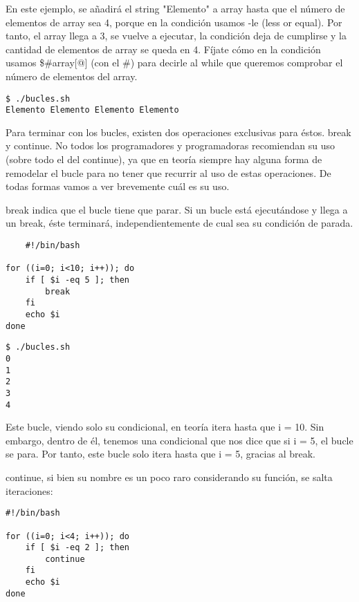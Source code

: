 En este ejemplo, se añadirá el string "Elemento" a array hasta que el número de elementos de array sea 4, porque en la condición usamos -le (less or equal). Por tanto, el array llega a 3, se vuelve a ejecutar, la condición deja de cumplirse y la cantidad de elementos de array se queda en 4. Fíjate cómo en la condición usamos \${\#array[@]} (con el \#) para decirle al while que queremos comprobar el número de elementos del array.

\begin{tcolorbox-code}
\begin{lstlisting}
$ ./bucles.sh
Elemento Elemento Elemento Elemento
\end{lstlisting}
\end{tcolorbox-code}

Para terminar con los bucles, existen dos operaciones exclusivas para éstos. break y continue. No todos los programadores y programadoras recomiendan su uso (sobre todo el del continue), ya que en teoría siempre hay alguna forma de remodelar el bucle para no tener que recurrir al uso de estas operaciones. De todas formas vamos a ver brevemente cuál es su uso.

break indica que el bucle tiene que parar. Si un bucle está ejecutándose y llega a un break, éste terminará, independientemente de cual sea su condición de parada.

\begin{tcolorbox-code}
\begin{lstlisting}
    #!/bin/bash

for ((i=0; i<10; i++)); do
    if [ $i -eq 5 ]; then
		break
    fi
    echo $i
done
\end{lstlisting}
\end{tcolorbox-code}

\begin{tcolorbox-code}
\begin{lstlisting}
$ ./bucles.sh
0
1
2
3
4
\end{lstlisting}
\end{tcolorbox-code}

Este bucle, viendo solo su condicional, en teoría itera hasta que i = 10. Sin embargo, dentro de él, tenemos una condicional que nos dice que si i = 5, el bucle se para. Por tanto, este bucle solo itera hasta que i = 5, gracias al break.

continue, si bien su nombre es un poco raro considerando su función, se salta iteraciones:

\begin{tcolorbox-code}
\begin{lstlisting}
#!/bin/bash

for ((i=0; i<4; i++)); do
	if [ $i -eq 2 ]; then
		continue
	fi
    echo $i
done
\end{lstlisting}
\end{tcolorbox-code}

